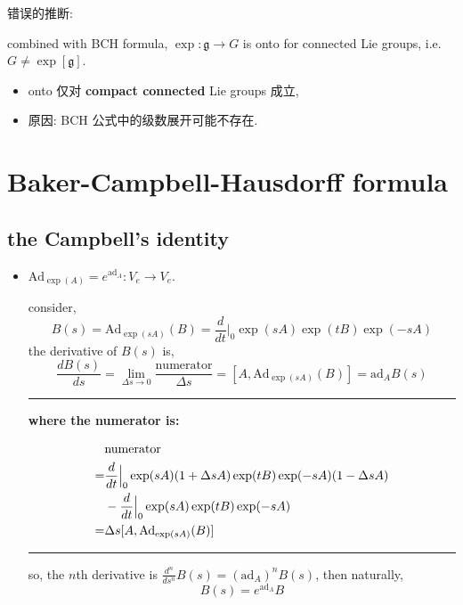 \begin{itemize}
	错误的推断:
	
	combined with BCH formula, $\exp : \mathfrak{g} \rightarrow G$ is onto for connected Lie groups, i.e. $G \neq \exp[\mathfrak{g}]$.
	\begin{itemize}
		\item onto 仅对 \textbf{compact connected} Lie groups 成立,
		
		\item 原因: BCH 公式中的级数展开可能不存在.
	\end{itemize}
\end{itemize}

\section{Baker-Campbell-Hausdorff formula}
\subsection{the Campbell's identity}
\begin{itemize}
	\item $\mathrm{Ad}_{\exp(A)} = e^{\mathrm{ad}_A} : V_e \rightarrow V_e$.
	
	\begin{tcolorbox}[title=proof: (maybe not very rigorously)]
		consider,
		\begin{equation}
			B(s) = \mathrm{Ad}_{\exp(s A)}(B) = \frac{d}{dt} \Big|_0 \exp(s A) \exp(t B) \exp(- s A)
		\end{equation}
		the derivative of $B(s)$ is,
		\begin{equation}
			\frac{d B(s)}{ds} = \lim_{\Delta s \rightarrow 0} \frac{\text{numerator}}{\Delta s} = [A, \mathrm{Ad}_{\exp(s A)}(B)] = \mathrm{ad}_A B(s)
		\end{equation}
		
		\noindent\rule[0.5ex]{\linewidth}{0.5pt} %
		
		\textbf{where the numerator is:}
		
		\begin{align}
			& \text{numerator} \notag \\
			=& \frac{d}{dt} \Big|_0 \exp(s A) (1 + \Delta s A) \exp(t B) \exp(- s A) (1 - \Delta s A) \notag \\
			& - \frac{d}{dt} \Big|_0 \exp(s A) \exp(t B) \exp(- s A) \notag \\
			=& \Delta s [A, \mathrm{Ad}_{\exp(s A)}(B)]
		\end{align}
		
		\noindent\rule[0.5ex]{\linewidth}{0.5pt} %
		
		so, the $n$th derivative is $\frac{d^n}{ds^n} B(s) = (\mathrm{ad}_A)^n B(s)$, then naturally,
		\begin{equation}
			B(s) = e^{\mathrm{ad}_A} B
		\end{equation}
	\end{tcolorbox}
\end{itemize}

